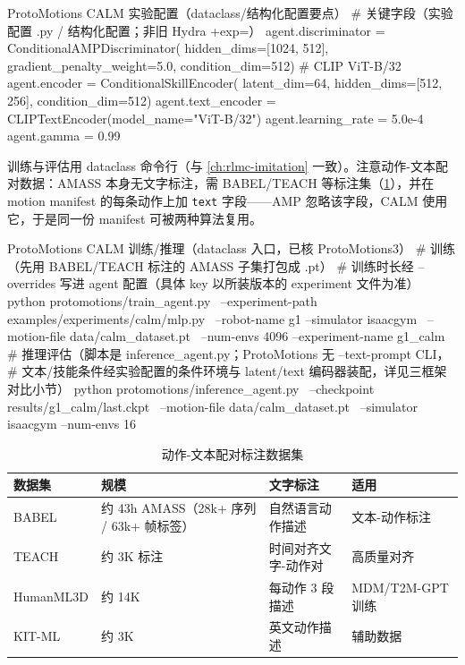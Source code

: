 \begin{codebox}[Python]{ProtoMotions CALM 实验配置（dataclass/结构化配置要点）}
# 关键字段（实验配置 .py / 结构化配置；非旧 Hydra +exp=）
agent.discriminator = ConditionalAMPDiscriminator(
    hidden_dims=[1024, 512], gradient_penalty_weight=5.0,
    condition_dim=512)                       # CLIP ViT-B/32
agent.encoder = ConditionalSkillEncoder(
    latent_dim=64, hidden_dims=[512, 256], condition_dim=512)
agent.text_encoder = CLIPTextEncoder(model_name="ViT-B/32")
agent.learning_rate = 5.0e-4
agent.gamma = 0.99
\end{codebox}

训练与评估用 dataclass 命令行（与 \cref{ch:rlmc-imitation} 一致）。注意动作-文本配对数据：AMASS 本身无文字标注，需 BABEL/TEACH 等标注集（\cref{tab:rlmc-mm-textdata}），并在 motion manifest 的每条动作上加 \verb|text| 字段——AMP 忽略该字段，CALM 使用它，于是同一份 manifest 可被两种算法复用。

\begin{codebox}[bash]{ProtoMotions CALM 训练/推理（dataclass 入口，已核 ProtoMotions3）}
# 训练（先用 BABEL/TEACH 标注的 AMASS 子集打包成 .pt）
# 训练时长经 --overrides 写进 agent 配置（具体 key 以所装版本的 experiment 文件为准）
python protomotions/train_agent.py \
    --experiment-path examples/experiments/calm/mlp.py \
    --robot-name g1 --simulator isaacgym \
    --motion-file data/calm_dataset.pt \
    --num-envs 4096 --experiment-name g1_calm
# 推理评估（脚本是 inference_agent.py；ProtoMotions 无 --text-prompt CLI，
#   文本/技能条件经实验配置的条件环境与 latent/text 编码器装配，详见三框架对比小节）
python protomotions/inference_agent.py \
    --checkpoint results/g1_calm/last.ckpt \
    --motion-file data/calm_dataset.pt \
    --simulator isaacgym --num-envs 16
\end{codebox}

\begin{table}[ht]
\centering
\small
\caption{动作-文本配对标注数据集}
\label{tab:rlmc-mm-textdata}
\begin{tabular}{@{}llll@{}}
\toprule
数据集 & 规模 & 文字标注 & 适用 \\
\midrule
BABEL & 约 43h AMASS（28k+ 序列 / 63k+ 帧标签） & 自然语言动作描述 & 文本-动作标注 \\
TEACH & 约 3K 标注 & 时间对齐文字-动作对 & 高质量对齐 \\
HumanML3D & 约 14K & 每动作 3 段描述 & MDM/T2M-GPT 训练 \\
KIT-ML & 约 3K & 英文动作描述 & 辅助数据 \\
\bottomrule
\end{tabular}
\end{table}

